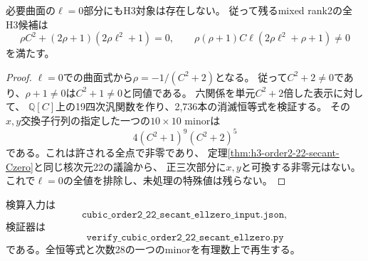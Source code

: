 \begin{theorem}[$\ell=0$部分の全値排除]
\label{thm:h3-order2-22-secant-ellzero}
必要曲面の$\ell=0$部分にもH3対象は存在しない。
従って残るmixed rank2の全H3候補は
\[
 \rho C^2+(2\rho+1)(2\rho\ell^2+1)=0,\qquad
 \rho(\rho+1)C\ell(2\rho\ell^2+\rho+1)\ne0
\]
を満たす。
\end{theorem}
\begin{proof}
$\ell=0$での曲面式から$\rho=-1/(C^2+2)$となる。
従って$C^2+2\ne0$であり、$\rho+1\ne0$は$C^2+1\ne0$と同値である。
六関係を単元$C^2+2$倍した表示に対して、
$\mathbb Q[C]$上の19四次汎関数を作り、2,736本の消滅恒等式を検証する。
その$x,y$交換子行列の指定した一つの$10\times10$ minorは
\[
 4(C^2+1)^9(C^2+2)^5
\]
である。これは許される全点で非零であり、
定理\ref{thm:h3-order2-22-secant-Czero}と同じ核次元22の議論から、
正三次部分に$x,y$と可換する非零元はない。
これで$\ell=0$の全値を排除し、未処理の特殊値は残らない。
\end{proof}

検算入力は
\[
 \texttt{cubic\_order2\_22\_secant\_ellzero\_input.json},
\]
検証器は
\[
 \texttt{verify\_cubic\_order2\_22\_secant\_ellzero.py}
\]
である。全恒等式と次数28の一つのminorを有理数上で再生する。


